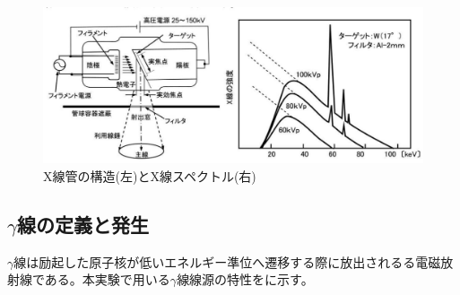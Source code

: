 \begin{figure}[H]
 \begin{center}
 \includegraphics[width=14cm]{image/other/X-ray.eps}
 \end{center}
 \caption{X線管の構造(左)とX線スペクトル(右)\cite{iinuma}}
 \label{fig:Xray}
\end{figure}

%

\subsection{$\gamma$線の定義と発生}
$\gamma$線は励起した原子核が低いエネルギー準位へ遷移する際に放出されるる電磁放射線である。本実験で用いる$\gamma$線線源の特性をに示す。

